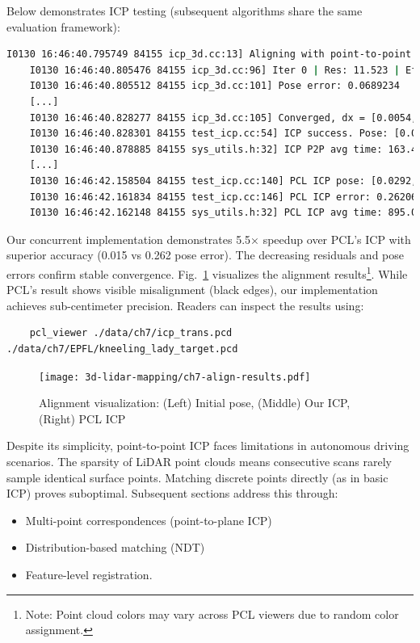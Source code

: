 Below demonstrates ICP testing (subsequent algorithms share the same evaluation framework):

\begin{lstlisting}[language=sh,caption=Terminal output]
	I0130 16:46:40.795749 84155 icp_3d.cc:13] Aligning with point-to-point ICP
	I0130 16:46:40.805476 84155 icp_3d.cc:96] Iter 0 | Res: 11.523 | Eff: 44455 | Avg: 0.000259 | dx: 0.027
	I0130 16:46:40.805512 84155 icp_3d.cc:101] Pose error: 0.0689234
	[...]
	I0130 16:46:40.828277 84155 icp_3d.cc:105] Converged, dx = [0.0054, -0.0021, -0.0035, -0.0009, 0.0018, -0.0023]
	I0130 16:46:40.828301 84155 test_icp.cc:54] ICP success. Pose: [0.0265, -0.0107, -0.0235, 0.9993], [-0.0689, -0.1033, 0.0050]
	I0130 16:46:40.878885 84155 sys_utils.h:32] ICP P2P avg time: 163.421ms (1 runs)
	[...] 
	I0130 16:46:42.158504 84155 test_icp.cc:140] PCL ICP pose: [0.0292, -0.0092, -0.0195, 0.9993], [-0.0636, -0.0567, 0.0027]
	I0130 16:46:42.161834 84155 test_icp.cc:146] PCL ICP error: 0.262063
	I0130 16:46:42.162148 84155 sys_utils.h:32] PCL ICP avg time: 895.009ms (1 runs)
\end{lstlisting}

Our concurrent implementation demonstrates 5.5× speedup over PCL's ICP with superior accuracy (0.015 vs 0.262 pose error). The decreasing residuals and pose errors confirm stable convergence. Fig.~\ref{fig:icp-align-results} visualizes the alignment results\footnote{Note: Point cloud colors may vary across PCL viewers due to random color assignment.}. While PCL's result shows visible misalignment (black edges), our implementation achieves sub-centimeter precision. Readers can inspect the results using:

\begin{lstlisting}
	pcl_viewer ./data/ch7/icp_trans.pcd ./data/ch7/EPFL/kneeling_lady_target.pcd
\end{lstlisting}

\begin{figure}
	\centering
	\texttt{[image: 3d-lidar-mapping/ch7-align-results.pdf]}
	\caption{Alignment visualization: (Left) Initial pose, (Middle) Our ICP, (Right) PCL ICP}
	\label{fig:icp-align-results}
\end{figure}

Despite its simplicity, point-to-point ICP faces limitations in autonomous driving scenarios. The sparsity of LiDAR point clouds means consecutive scans rarely sample identical surface points. Matching discrete points directly (as in basic ICP) proves suboptimal. Subsequent sections address this through:
\begin{itemize}
	\item Multi-point correspondences (point-to-plane ICP)
	\item Distribution-based matching (NDT)
	\item Feature-level registration.
\end{itemize}

